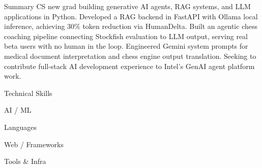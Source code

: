 \documentclass{resume}
\begin{document}
\vspace{-0.15cm}

\begin{rSection}{Summary}
CS new grad building generative AI agents, RAG systems, and LLM applications in Python. Developed a RAG backend in FastAPI with Ollama local inference, achieving 30\% token reduction via HumanDelta. Built an agentic chess coaching pipeline connecting Stockfish evaluation to LLM output, serving real beta users with no human in the loop. Engineered Gemini system prompts for medical document interpretation and chess engine output translation. Seeking to contribute full-stack AI development experience to Intel's GenAI agent platform work.
\end{rSection}
\vspace{-0.15cm}

\begin{rSection}{Technical Skills}

\begin{skillgroup}{AI / ML}
\end{skillgroup}

\begin{skillgroup}{Languages}
\end{skillgroup}

\begin{skillgroup}{Web / Frameworks}
\end{skillgroup}

\begin{skillgroup}{Tools \& Infra}
\end{skillgroup}

\end{rSection}
\vspace{-0.15cm}
\end{document}
